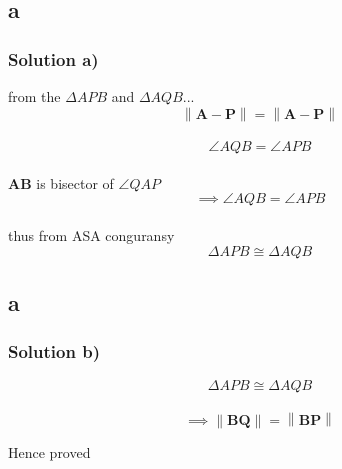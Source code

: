 \documentclass{beamer}
\newcommand\norm[1]{\left\lVert#1\right\rVert}
\renewcommand{\vec}[1]{\mathbf{#1}}
\begin{document}
\subsection{a}
\begin{frame}
\frametitle{Solution a)}
\footnotesize
\label{a}
from the $\Delta APB$ and $\Delta{AQB}$... 
\\
$$\norm{\vec{A-P}} = \norm{\vec{A-P}}$$
\\
$$\angle{AQB} = \angle{APB}$$
\\
$\vec{AB}$ is bisector of $\angle QAP$
\\
$$\implies\angle{AQB} = \angle{APB}$$
\\
thus from ASA conguransy
\\
$$\Delta APB \cong \Delta AQB$$
\end{frame}

\subsection{a}
\begin{frame}
	\frametitle{Solution b)}
$$\Delta APB \cong \Delta AQB$$
\\
$$\implies\norm{\vec{BQ}} = \norm{\vec{BP}}$$

	\centering Hence proved
\end{frame}
\end{document}
